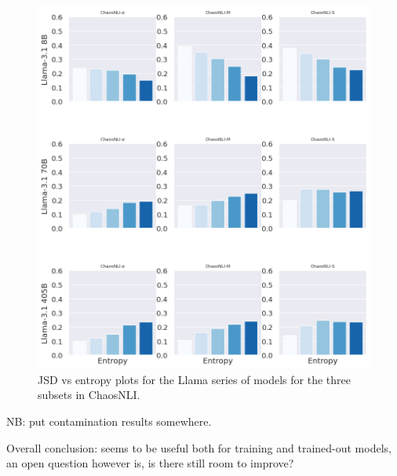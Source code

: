 \begin{figure}
    \centering
    \includegraphics[width=0.7\linewidth]{figures/entropy_jsd.png}
    \caption{JSD vs entropy plots for the Llama series of models for the three subsets in ChaosNLI.}
    \label{fig:entropy_jsd}
\end{figure}

NB: put contamination results somewhere.

Overall conclusion: seems to be useful both for training and trained-out models, an open question however is, is there still room to improve?


